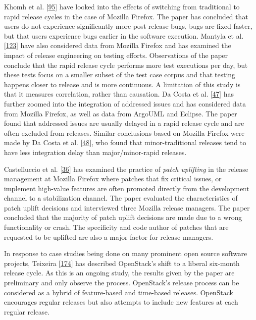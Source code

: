 \documentclass[]{book}
\begin{document}
Khomh et al. {[}\protect\hyperlink{ref-khomh2015a}{95}{]} have looked
into the effects of switching from traditional to rapid release cycles
in the case of Mozilla Firefox. The paper has concluded that users do
not experience significantly more post-release bugs, bugs are fixed
faster, but that users experience bugs earlier in the software
execution. Mantyla et al.
{[}\protect\hyperlink{ref-mantyla2015a}{123}{]} have also considered
data from Mozilla Firefox and has examined the impact of release
engineering on testing efforts. Observations of the paper conclude that
the rapid release cycle performs more test executions per day, but these
tests focus on a smaller subset of the test case corpus and that testing
happens closer to release and is more continuous. A limitation of this
study is that it measures correlation, rather than causation. Da Costa
et al. {[}\protect\hyperlink{ref-da2014a}{47}{]} has further zoomed into
the integration of addressed issues and has considered data from Mozilla
Firefox, as well as data from ArgoUML and Eclipse. The paper found that
addressed issues are usually delayed in a rapid release cycle and are
often excluded from releases. Similar conclusions based on Mozilla
Firefox were made by Da Costa et al.
{[}\protect\hyperlink{ref-da2016a}{48}{]}, who found that
minor-traditional releases tend to have less integration delay than
major/minor-rapid releases.

Castelluccio et al. {[}\protect\hyperlink{ref-castelluccio2017a}{36}{]}
has examined the practice of \emph{patch uplifting} in the release
management at Mozilla Firefox where patches that fix critical issues, or
implement high-value features are often promoted directly from the
development channel to a stabilization channel. The paper evaluated the
characteristics of patch uplift decisions and interviewed three Mozilla
release managers. The paper concluded that the majority of patch uplift
decisions are made due to a wrong functionality or crash. The
specificity and code author of patches that are requested to be uplifted
are also a major factor for release managers.

In response to case studies being done on many prominent open source
software projects, Teixeira
{[}\protect\hyperlink{ref-teixeira2017a}{174}{]} has described
OpenStack's shift to a liberal six-month release cycle. As this is an
ongoing study, the results given by the paper are preliminary and only
observe the process. OpenStack's release process can be considered as a
hybrid of feature-based and time-based releases. OpenStack encourages
regular releases but also attempts to include new features at each
regular release.
\end{document}
